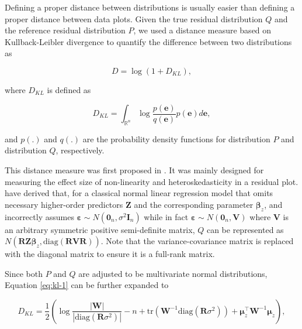 \documentclass[]{interact}
\theoremstyle{plain}%
\theoremstyle{definition}
\theoremstyle{remark}
\begin{document}
Defining a proper distance between distributions is usually easier than
defining a proper distance between data plots. Given the true residual
distribution \(Q\) and the reference residual distribution \(P\), we
used a distance measure based on Kullback-Leibler divergence
\citep{kullback1951information} to quantify the difference between two
distributions as

\begin{equation} \label{eq:kl-0}
D = \log\left(1 + D_{KL}\right),
\end{equation}

where \(D_{KL}\) is defined as

\begin{equation} \label{eq:kl-1}
D_{KL} = \int_{\mathbb{R}^{n}}\log\frac{p(\boldsymbol{e})}{q(\boldsymbol{e})}p(\boldsymbol{e})d\boldsymbol{e},
\end{equation}

\noindent and \(p(.)\) and \(q(.)\) are the probability density
functions for distribution \(P\) and distribution \(Q\), respectively.

This distance measure was first proposed in \citet{li2024plot}. It was
mainly designed for measuring the effect size of non-linearity and
heteroskedasticity in a residual plot. \citet{li2024plot} have derived
that, for a classical normal linear regression model that omits
necessary higher-order predictors \(\boldsymbol{Z}\) and the
corresponding parameter \(\boldsymbol{\beta}_z\), and incorrectly
assumes
\(\boldsymbol{\varepsilon} \sim N(\boldsymbol{0}_n,\sigma^2\boldsymbol{I}_n)\)
while in fact
\(\boldsymbol{\varepsilon} \sim N(\boldsymbol{0}_n, \boldsymbol{V})\)
where \(\boldsymbol{V}\) is an arbitrary symmetric positive
semi-definite matrix, \(Q\) can be represented as
\(N(\boldsymbol{R}\boldsymbol{Z}\boldsymbol{\beta}_z, \text{diag}(\boldsymbol{R}\boldsymbol{V}\boldsymbol{R}))\).
Note that the variance-covariance matrix is replaced with the diagonal
matrix to ensure it is a full-rank matrix.

Since both \(P\) and \(Q\) are adjusted to be multivariate normal
distributions, Equation \ref{eq:kl-1} can be further expanded to

\begin{equation} \label{eq:kl-2}
D_{KL} = \frac{1}{2}\left(\log\frac{|\boldsymbol{W}|}{|\text{diag}(\boldsymbol{R}\sigma^2)|} - n + \text{tr}(\boldsymbol{W}^{-1}\text{diag}(\boldsymbol{R}\sigma^2)) + \boldsymbol{\mu}_z^\top\boldsymbol{W}^{-1}\boldsymbol{\mu}_z\right),
\end{equation}
\end{document}

